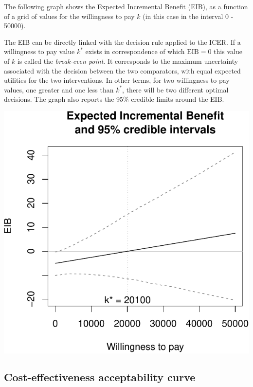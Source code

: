 \documentclass[]{article}
\begin{document}
The following graph shows the Expected Incremental Benefit (EIB), as a
function of a grid of values for the willingness to pay \(k\) (in this
case in the interval 0 - 50000).

The EIB can be directly linked with the decision rule applied to the
ICER. If a willingness to pay value \(k^*\) exists in correspondence of
which \(\mbox{EIB}=0\) this value of \(k\) is called the
\emph{break-even point}. It corresponds to the maximum uncertainty
associated with the decision between the two comparators, with equal
expected utilities for the two interventions. In other terms, for two
willingness to pay values, one greater and one less than \(k^*\), there
will be two different optimal decisions. The graph also reports the 95\%
credible limits around the EIB.

\begin{center}\includegraphics{report_files/figure-latex/unnamed-chunk-4-1} \end{center}

\hypertarget{cost-effectiveness-acceptability-curve}{%
\subsection{Cost-effectiveness acceptability
curve}\label{cost-effectiveness-acceptability-curve}}
\end{document}
